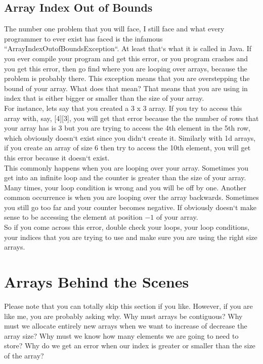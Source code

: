 \documentclass[11]{article}
\begin{document}
\subsection{Array Index Out of Bounds}
The number one problem that you will face, I still face and what every programmer to ever exist has faced is the infamous ``ArrayIndexOutofBoundsException``. At least that`s what it is called in Java. If you ever compile your program and get this error, or you program crashes and you get this error, then go find where you are looping over arrays, because the problem is probably there. This exception means that you are overstepping the bound of your array. What does that mean? That means that you are using in index that is either bigger or smaller than the size of your array.\\

For instance, lets say that you created a 3 x 3 array. If you try to access this array with, say, [4][3], you will get that error because the the number of rows that your array has is 3 but you are trying to access the 4th element in the 5th row, which obviously doesn`t exist since you didn`t create it. Similarly with 1d arrays, if you create an array of size 6 then try to access the 10th element, you will get this error because it doesn`t exist.\\

This commonly happens when you are looping over your array. Sometimes you get into an infinite loop and the counter is greater than the size of your array. Many times, your loop condition is wrong and you will be off by one. Another common occurrence is when you are looping over the array backwards. Sometimes you still go too far and your counter becomes negative. If obviously doesn`t make sense to be accessing the element at position $-1$ of your array.\\

So if you come across this error, double check your loops, your loop conditions, your indices that you are trying to use and make sure you are using the right size arrays.

\section{Arrays Behind the Scenes}
Please note that you can totally skip this section if you like. However, if you are like me, you are probably asking why. Why must arrays be contiguous? Why must we allocate entirely new arrays when we want to increase of decrease the array size? Why must we know how many elements we are going to need to store? Why do we get an error when our index is greater or smaller than the size of the array?
\end{document}
